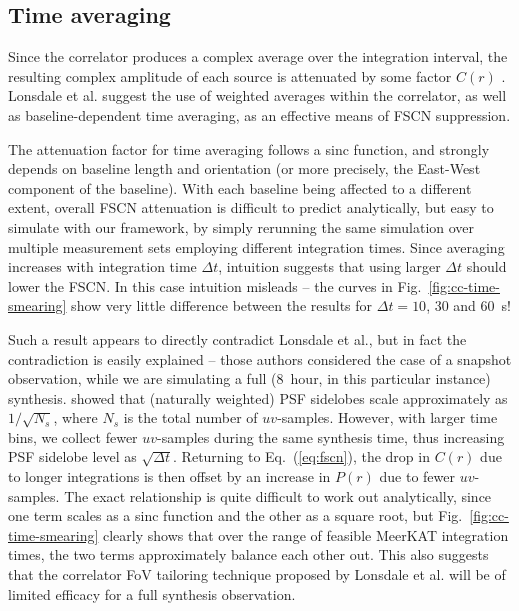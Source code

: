 \documentclass{aa}
\begin{document}
\subsection{Time averaging}
\label{sec:smearing}

Since the correlator produces a complex average over the integration interval, the resulting complex amplitude of each source is attenuated by some factor $C(r)$ \citep[see Eq.~(\ref{eq:fscn}) above, and also Fig.~2 of][]{SKA54-expa,SKA54}. Lonsdale et al. suggest the use of weighted averages within the correlator, as well as baseline-dependent time averaging, as an effective means of FSCN suppression.

The attenuation factor for time averaging follows a sinc function, and strongly depends on baseline length and orientation (or more precisely, the East-West component of the baseline). With each baseline being affected to a different extent, overall FSCN attenuation is difficult to predict analytically, but easy to simulate with our framework, by simply rerunning the same simulation over multiple measurement sets employing different integration times. Since averaging increases with integration time $\Delta t$, intuition suggests that using larger $\Delta t$ should lower the FSCN. In this case intuition misleads -- the curves in Fig.~\ref{fig:cc-time-smearing} show very little difference between the results for $\Delta t=10$, 30 and 60~s!

Such a result appears to directly contradict Lonsdale et al., but in fact the contradiction is easily explained -- those authors considered the case of a snapshot observation, while we are simulating a full (8~hour, in this particular instance) synthesis. \citet{SKA49} showed that (naturally weighted) PSF sidelobes scale approximately as $1/\sqrt{N_s}$, where $N_s$ is the total number of $uv$-samples. However, with larger time bins, we collect fewer $uv$-samples during the same synthesis time, thus increasing PSF sidelobe level as $\sqrt{\Delta t}$. Returning to Eq.~(\ref{eq:fscn}), the drop in $C(r)$ due to longer integrations is then offset by an increase in $P(r)$ due to fewer $uv$-samples. The exact relationship is quite difficult to work out analytically, since one term scales as a sinc function and the other as a square root, but  Fig.~\ref{fig:cc-time-smearing} clearly shows that over the range of feasible MeerKAT integration times, the two terms approximately balance each other out. This also 
suggests that the correlator FoV tailoring technique proposed by Lonsdale et al. will be of limited efficacy for a full synthesis observation.
\end{document}
